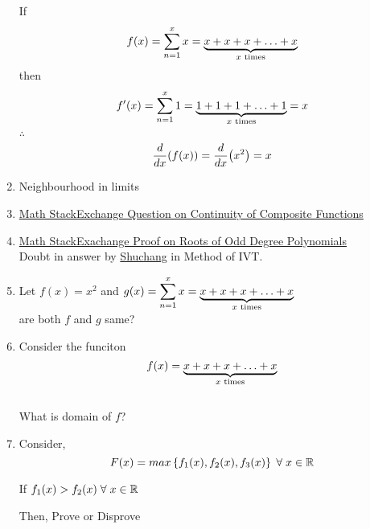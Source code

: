 \documentclass{article}
\begin{document}
\begin{enumerate}
            If $$f(x)=\displaystyle\sum_{n=1}^{x} x=\underbrace{x+x+x+\ldots +x}_{x \hspace{1mm} \text{times}}$$
            then $$f'(x)=\displaystyle\sum_{n=1}^{x} 1=\underbrace{1+1+1+\ldots+1}_{x \hspace{1mm} \text{times}}=x$$
            $\therefore$ $$\dv{x}(f(x))=\dv{x}(x^2)=x$$
      \item Neighbourhood in limits
      \item \href{https://math.stackexchange.com/questions/4892287/is-this-result-on-continuity-of-composite-functions-true}{Math StackExchange Question on Continuity of Composite Functions}
      \item \href{https://math.stackexchange.com/questions/689575/proof-that-every-polynomial-of-odd-degree-has-one-real-root}{Math StackExachange Proof on Roots of Odd Degree Polynomials } \\ Doubt in answer by  \href{https://math.stackexchange.com/users/91982/shuchang}{Shuchang} in Method of IVT.
      \item Let $f(x)=x^2$ and $g(x)=\displaystyle\sum_{n=1}^{x}x=\underbrace{x+x+x+\ldots +x}_{x \hspace{1mm} \text{times}}$
            \\ are both $f$ and $g$ same?
      \item Consider the funciton $$f(x)=\underbrace{x+x+x+\ldots+x}_{x \hspace{1mm} \text{times}}$$ \\
            What is domain of $f$?
      \item Consider, $$F(x)=max\left\{f_{1}(x),f_{2}(x),f_{3}(x)\right\} \hspace{1mm} \forall \hspace{1mm} x \in \mathbb{R}$$

            If $f_{1}(x) > f_{2}(x) \hspace{1mm} \forall \hspace{1mm} x \in \mathbb{R}$

            Then, Prove or Disprove


\end{enumerate}
\end{document}

